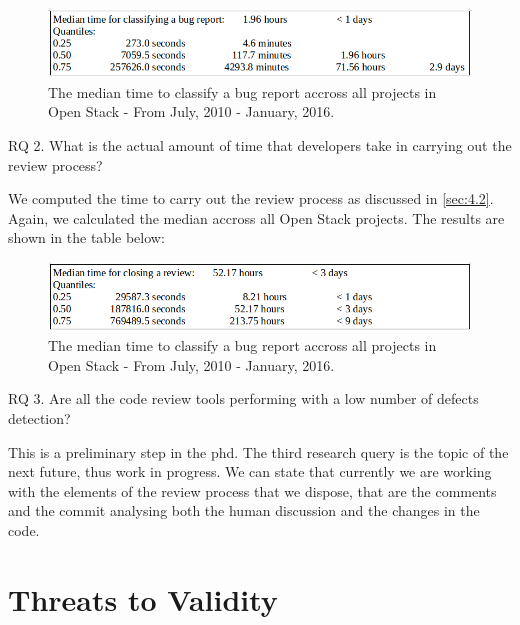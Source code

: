 \documentclass[ifip]{svmult}
\begin{document}
\begin{figure}[H]
\centering

\includegraphics[width=1.0\textwidth,natwidth=779,natheight=129]{t-c.png}

\caption{The median time to classify a bug report accross all projects in Open Stack - From July, 2010 - January, 2016.}
\label{fig:3}       %
\end{figure}

RQ 2. What is the actual amount of time that developers take in carrying out the review process?

We computed the time to carry out the review process as discussed in \ref{sec:4.2}.
Again, we calculated the median accross all Open Stack projects. The results are shown in the table below:

\begin{figure}[H]
\centering

\includegraphics[width=1.0\textwidth,natwidth=779,natheight=129]{t-r1.png}

\caption{The median time to classify a bug report accross all projects in Open Stack - From July, 2010 - January, 2016.}
\label{fig:4}       %
\end{figure}

RQ 3. Are all the code review tools performing with a low number of defects detection?

This is a preliminary step in the phd. The third research query is the topic of the next future, thus work in progress.
We can state that currently we are working with the elements of the review process that we dispose, that are 
the comments and the commit 
analysing both the human discussion and the changes in the code. 

\section{Threats to Validity}
\label{sec:6}
\end{document}
